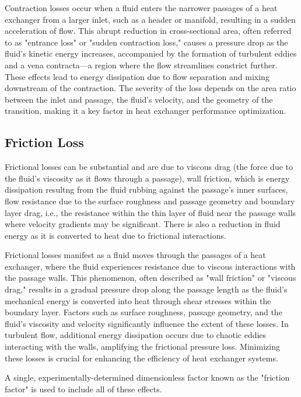 \documentclass[12pt]{article}
\begin{document}
Contraction losses occur when a fluid enters the narrower passages of a heat exchanger from a larger inlet, such as a header or manifold, resulting in a sudden acceleration of flow. This abrupt reduction in cross-sectional area, often referred to as "entrance loss" or "sudden contraction loss," causes a pressure drop as the fluid's kinetic energy increases, accompanied by the formation of turbulent eddies and a vena contracta—a region where the flow streamlines constrict further. These effects lead to energy dissipation due to flow separation and mixing downstream of the contraction. The severity of the loss depends on the area ratio between the inlet and passage, the fluid's velocity, and the geometry of the transition, making it a key factor in heat exchanger performance optimization.

\subsection{Friction Loss}
Frictional losses can be substantial and are due to viscous drag (the force due to the fluid's viscosity as it flows through a passage), wall friction, which is energy dissipation resultng from the fluid rubbing against the passage's inner surfaces, flow resistance due to the surface roughness and passage geometry and boundary layer drag, i.e., the resistance within the thin layer of fluid near the passage walls where velocity gradients may be significant. There is also a reduction in fluid energy as it is converted to heat due to frictional interactions.

Frictional losses manifest as a fluid moves through the passages of a heat exchanger, where the fluid experiences resistance due to viscous interactions with the passage walls. This phenomenon, often described as "wall friction" or "viscous drag," results in a gradual pressure drop along the passage length as the fluid's mechanical energy is converted into heat through shear stresses within the boundary layer. Factors such as surface roughness, passage geometry, and the fluid's viscosity and velocity significantly influence the extent of these losses. In turbulent flow, additional energy dissipation occurs due to chaotic eddies interacting with the walls, amplifying the frictional pressure loss. Minimizing these losses is crucial for enhancing the efficiency of heat exchanger systems.

A single, experimentally-determined dimensionless factor known as the "friction factor" is used to include all of these effects. 
\end{document}
